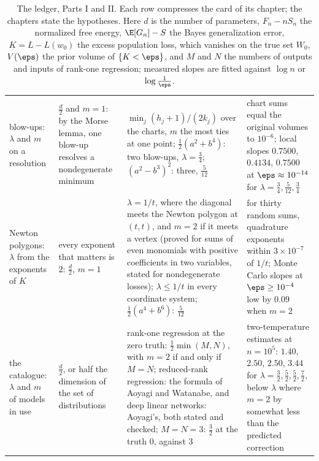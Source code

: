 \begin{refsection}
\begin{table}[p]
\begin{fullwidth}
\begin{tabularx}{\linewidth}{@{}>{\raggedright\arraybackslash}p{25mm}>{\hsize=0.72\hsize\raggedright\arraybackslash}X>{\hsize=1.2\hsize\raggedright\arraybackslash}X>{\hsize=1.08\hsize\raggedright\arraybackslash}X@{}}
5\enspace blow-ups: $\lambda$ and $m$ on a resolution & $\frac d2$ and $m=1$: by the Morse lemma, one blow-up resolves a nondegenerate minimum & $\min_j(h_j+1)/(2k_j)$ over the charts, $m$ the most ties at one point; $\frac12(a^2+b^4)$: two blow-ups, $\lambda=\frac34$; $(a^2-b^3)^2$: three, $\frac5{12}$ & chart sums equal the original volumes to $10^{-6}$; local slopes $0.7500$, $0.4134$, $0.7500$ at $\eps\approx10^{-14}$ for $\lambda=\frac34,\frac5{12},\frac34$ \\
6\enspace Newton polygons: $\lambda$ from the exponents of $K$ & every exponent that matters is $2$: $\frac d2$, $m=1$ & $\lambda=1/t$, where the diagonal meets the Newton polygon at $(t,t)$, and $m=2$ if it meets a vertex (proved for sums of even monomials with positive coefficients in two variables, stated for nondegenerate losses); $\lambda\le1/t$ in every coordinate system; $\frac12(a^4+b^6)$: $\frac5{12}$ & for thirty random sums, quadrature exponents within $3\times10^{-7}$ of $1/t$; Monte Carlo slopes at $\eps\ge10^{-4}$ low by $0.09$ when $m=2$ \\
7\enspace the catalogue: $\lambda$ and $m$ of models in use & $\frac d2$, or half the dimension of the set of distributions & rank-one regression at the zero truth: $\frac12\min(M,N)$, with $m=2$ if and only if $M=N$; reduced-rank regression: the formula of Aoyagi and Watanabe, and deep linear networks: Aoyagi's, both stated and checked; $M=N=3$: $\frac32$ at the truth $0$, against $3$ & two-temperature estimates at $n=10^5$: $1.40$, $2.50$, $2.50$, $3.44$ for $\lambda=\frac32,\frac52,\frac52,\frac72$, below $\lambda$ where $m=2$ by somewhat less than the predicted correction \\
\bottomrule
\end{tabularx}
\end{fullwidth}
\caption{The ledger, Parts I and II. Each row compresses the card of its chapter; the chapters state the hypotheses. Here $d$ is the number of parameters, $F_n-nS_n$ the normalized free energy, $\E[G_n]-S$ the Bayes generalization error, $K=L-L(w_0)$ the excess population loss, which vanishes on the true set $W_0$, $V(\eps)$ the prior volume of $\{K<\eps\}$, and $M$ and $N$ the numbers of outputs and inputs of rank-one regression; measured slopes are fitted against $\log n$ or $\log\frac1\eps$.}\label{tab:epilogue:ledger1}
\end{table}


\end{refsection}
